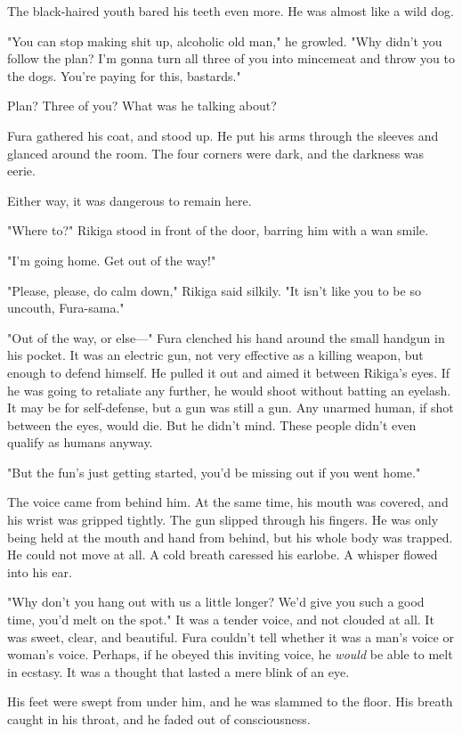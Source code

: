 The black-haired youth bared his teeth even more. He was almost like a
wild dog.

"You can stop making shit up, alcoholic old man," he growled. "Why
didn't you follow the plan? I'm gonna turn all three of you into
mincemeat and throw you to the dogs. You're paying for this, bastards."

Plan? Three of you? What was he talking about?

Fura gathered his coat, and stood up. He put his arms through the
sleeves and glanced around the room. The four corners were dark, and the
darkness was eerie.

Either way, it was dangerous to remain here.

"Where to?" Rikiga stood in front of the door, barring him with a wan
smile.

"I'm going home. Get out of the way!"

"Please, please, do calm down," Rikiga said silkily. "It isn't like you
to be so uncouth, Fura-sama."

"Out of the way, or else---" Fura clenched his hand around the small
handgun in his pocket. It was an electric gun, not very effective as a
killing weapon, but enough to defend himself. He pulled it out and aimed
it between Rikiga's eyes. If he was going to retaliate any further, he
would shoot without batting an eyelash. It may be for self-defense, but
a gun was still a gun. Any unarmed human, if shot between the eyes,
would die. But he didn't mind. These people didn't even qualify as
humans anyway.

"But the fun's just getting started, you'd be missing out if you went
home."

The voice came from behind him. At the same time, his mouth was covered,
and his wrist was gripped tightly. The gun slipped through his fingers.
He was only being held at the mouth and hand from behind, but his whole
body was trapped. He could not move at all. A cold breath caressed his
earlobe. A whisper flowed into his ear.

"Why don't you hang out with us a little longer? We'd give you such a
good time, you'd melt on the spot." It was a tender voice, and not
clouded at all. It was sweet, clear, and beautiful. Fura couldn't tell
whether it was a man's voice or woman's voice. Perhaps, if he obeyed
this inviting voice, he \emph{would} be able to melt in ecstasy. It was a
thought that lasted a mere blink of an eye.

His feet were swept from under him, and he was slammed to the floor. His
breath caught in his throat, and he faded out of consciousness.

